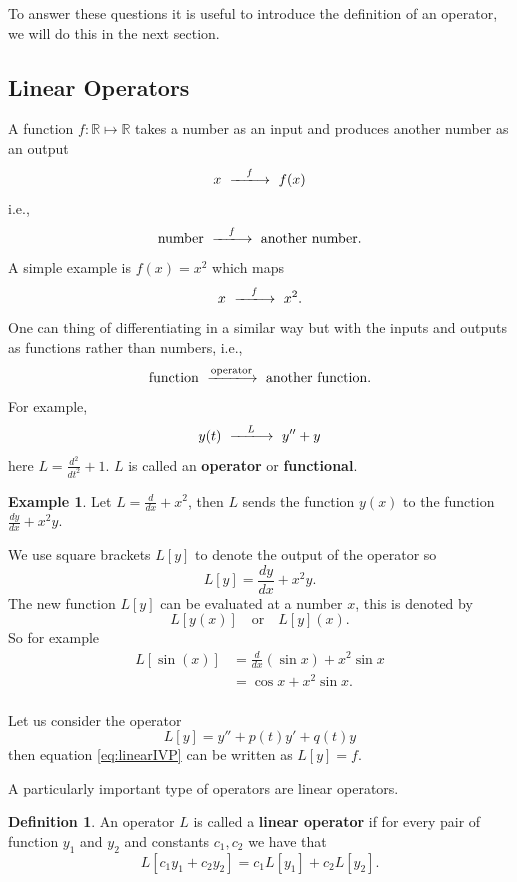 \documentclass{article}
\theoremstyle{plain}
\theoremstyle{definition}
\newtheorem{definition}[thm]{Definition}
\newtheorem{exmp}{Example}[section]
\numberwithin{equation}{section}
\begin{document}
To answer these questions it is useful to introduce the definition of an operator, we will do this in the next section.

\subsection{Linear Operators}

A function $f: \mathbb{R} \mapsto \mathbb{R}$ takes a number as an input and produces another number as an output
\[
    x \ \xlongrightarrow{\quad\textit{f}\quad} \ f(x)
\]
i.e.,
\[
    \text{number}\ \xlongrightarrow{\quad\textit{f}\quad} \ \text{another number}.
\]
A simple example is $f(x) = x^2$ which maps
\[
    x \ \xlongrightarrow{\quad\textit{f}\quad}  \ x^2.
\]
One can thing of differentiating in a similar way but with the inputs and outputs as functions rather than numbers, i.e.,
\[
    \text{function}\ \xlongrightarrow{\text{operator}}\ \text{another function}.
\]
For example,
\[
    y(t)\ \xlongrightarrow{\quad\textit{L}\quad} \ y'' + y
\]
here $L = \frac{d^2}{dt^2} + 1$. $L$ is called an \textbf{operator} or \textbf{functional}.

\begin{tcolorbox}
\begin{exmp}
    Let $L = \frac{d}{dx} + x^2$, then $L$ sends the function $y(x)$ to the function $\frac{dy}{dx} + x^2y$.

    We use square brackets $L[y]$ to denote the output of the operator so
    \[
        L[y] = \frac{dy}{dx} + x^2y.
    \]
    The new function $L[y]$ can be evaluated at a number $x$, this is denoted by
    $$ L[y(x)] \quad \text{or} \quad L[y](x).$$
    So for example
    \begin{align*}
        L\left[\sin(x)\right] &= \frac{d}{dx}\left( \sin x \right) + x^2 \sin x \\
        &= \cos x + x^2 \sin x. \\
    \end{align*}
\end{exmp}
\end{tcolorbox}

Let us consider the operator
\begin{equation*}
    L[y] = y'' + p(t)y' + q(t)y
\end{equation*}
then equation \eqref{eq:linearIVP} can be written as $L[y] = f$.

\bigskip
A particularly important type of operators are linear operators.

\begin{definition}
    An operator $L$ is called a \textbf{linear operator} if for every pair of function $y_1$ and $y_2$ and constants $c_1,c_2$ we have that
    \[
        L\left[ c_1y_1 + c_2y_2 \right] = c_1 L[y_1] + c_2 L[y_2].
    \]
\end{definition}
\end{document}
